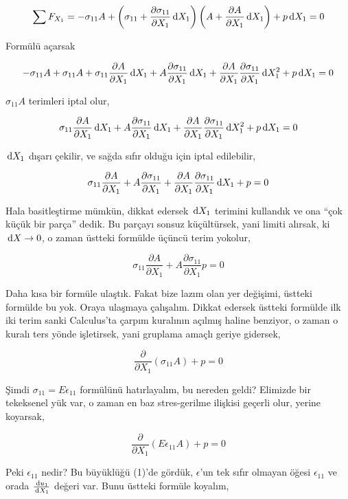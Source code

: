 \documentclass[12pt,fleqn]{article}\usepackage{../../common}
\begin{document}
$$ \sum F_{X_1} = - \sigma_{11} A +
\left( \sigma_{11} + \frac{\partial \sigma_{11}}{\partial X_1} \,\mathrm{d} X_1  \right)
\left( A + \frac{\partial A}{\partial X_1} \,\mathrm{d} X_1  \right) + p \,\mathrm{d} X_1 = 0
$$

Formülü açarsak

$$
-\sigma_{11} A  + \sigma_{11} A  +
\sigma_{11} \frac{\partial A}{\partial X_1} \,\mathrm{d} X_1 +
A \frac{\partial \sigma_{11}}{\partial X_1} \,\mathrm{d} X_1 +
\frac{\partial A}{\partial X_1} \frac{\partial \sigma_{11}}{\partial X_1} \,\mathrm{d} X_1^2 +
p \,\mathrm{d} X_1 = 0
$$

$\sigma_{11} A$ terimleri iptal olur,

$$
\sigma_{11} \frac{\partial A}{\partial X_1} \,\mathrm{d} X_1 +
A \frac{\partial \sigma_{11}}{\partial X_1} \,\mathrm{d} X_1 +
\frac{\partial A}{\partial X_1} \frac{\partial \sigma_{11}}{\partial X_1} \,\mathrm{d} X_1^2 +
p \,\mathrm{d} X_1 = 0
$$

$\,\mathrm{d} X_1$ dışarı çekilir, ve sağda sıfır olduğu için iptal edilebilir,

$$
\sigma_{11} \frac{\partial A}{\partial X_1}  +
A \frac{\partial \sigma_{11}}{\partial X_1}  +
\frac{\partial A}{\partial X_1} \frac{\partial \sigma_{11}}{\partial X_1} \,\mathrm{d} X_1 +
p  = 0
$$

Hala basitleştirme mümkün, dikkat edersek $\,\mathrm{d} X_1$ terimini kullandık ve
ona ``çok küçük bir parça'' dedik. Bu parçayı sonsuz küçültürsek, yani
limiti alırsak, ki $\,\mathrm{d} X \to 0$, o zaman üstteki formülde üçüncü terim
yokolur,

$$
\sigma_{11} \frac{\partial A}{\partial X_1}  +
A \frac{\partial \sigma_{11}}{\partial X_1}  
p  = 0
$$

Daha kısa bir formüle ulaştık. Fakat bize lazım olan yer değişimi, üstteki
formülde bu yok. Oraya ulaşmaya çalışalım. Dikkat edersek üstteki formülde
ilk iki terim sanki Calculus'ta çarpım kuralının açılmış haline benziyor,
o zaman o kuralı ters yönde işletirsek, yani gruplama amaçlı geriye gidersek,

$$
\frac{\partial }{\partial X_1} (\sigma_{11} A ) + p = 0
$$

Şimdi $\sigma_{11} = E \epsilon_{11}$ formülünü hatırlayalım, bu nereden geldi?
Elimizde bir tekeksenel yük var, o zaman en baz stres-gerilme ilişkisi geçerli
olur, yerine koyarsak,

$$
\frac{\partial }{\partial X_1} (E \epsilon_{11} A ) + p = 0
$$

Peki $\epsilon_{11}$ nedir? Bu büyüklüğü (1)'de gördük, $\epsilon$'un tek sıfır
olmayan öğesi $\epsilon_{11}$ ve orada $\frac{\,\mathrm{d} u_1}{\,\mathrm{d} X_1}$ değeri
var. Bunu üstteki formüle koyalım,
\end{document}
